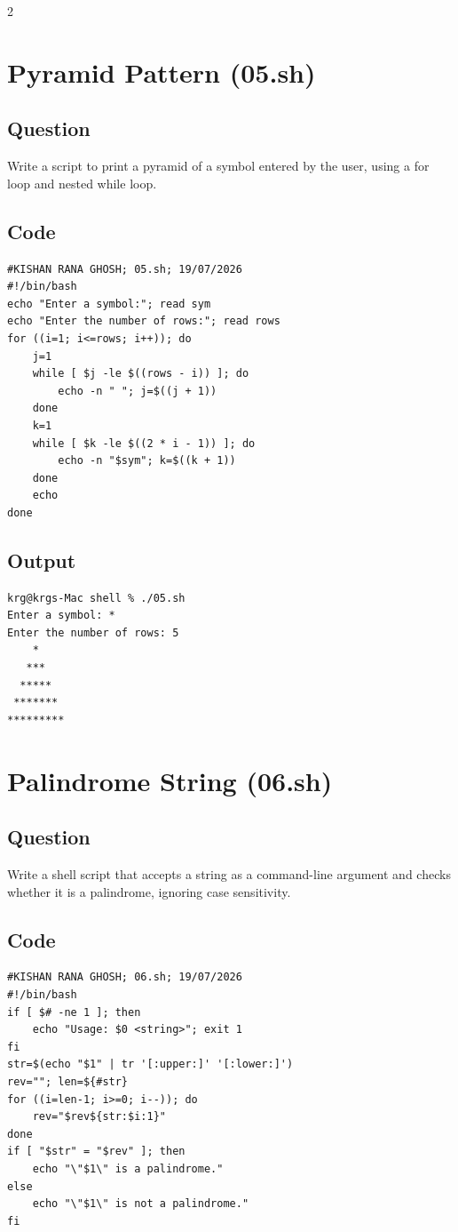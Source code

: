 \documentclass[a4paper,12pt]{article}
\begin{document}
\begin{multicols}{2}

\section{Pyramid Pattern (05.sh)}
\subsection*{Question}
Write a script to print a pyramid of a symbol entered by the user, using a for loop and nested while loop.

\subsection*{Code}
\begin{lstlisting}[style=bashstyle]
#KISHAN RANA GHOSH; 05.sh; 19/07/2026
#!/bin/bash
echo "Enter a symbol:"; read sym
echo "Enter the number of rows:"; read rows
for ((i=1; i<=rows; i++)); do
    j=1
    while [ $j -le $((rows - i)) ]; do
        echo -n " "; j=$((j + 1))
    done
    k=1
    while [ $k -le $((2 * i - 1)) ]; do
        echo -n "$sym"; k=$((k + 1))
    done
    echo
done
\end{lstlisting}

\subsection*{Output}
\begin{lstlisting}[style=outputstyle]
krg@krgs-Mac shell % ./05.sh
Enter a symbol: *
Enter the number of rows: 5
    *
   ***
  *****
 *******
*********
\end{lstlisting}

\columnbreak

\section{Palindrome String (06.sh)}
\subsection*{Question}
Write a shell script that accepts a string as a command-line argument and checks whether it is a palindrome, ignoring case sensitivity.

\subsection*{Code}
\begin{lstlisting}[style=bashstyle]
#KISHAN RANA GHOSH; 06.sh; 19/07/2026
#!/bin/bash
if [ $# -ne 1 ]; then
    echo "Usage: $0 <string>"; exit 1
fi
str=$(echo "$1" | tr '[:upper:]' '[:lower:]')
rev=""; len=${#str}
for ((i=len-1; i>=0; i--)); do
    rev="$rev${str:$i:1}"
done
if [ "$str" = "$rev" ]; then
    echo "\"$1\" is a palindrome."
else
    echo "\"$1\" is not a palindrome."
fi
\end{lstlisting}


\end{multicols}
\end{document}
